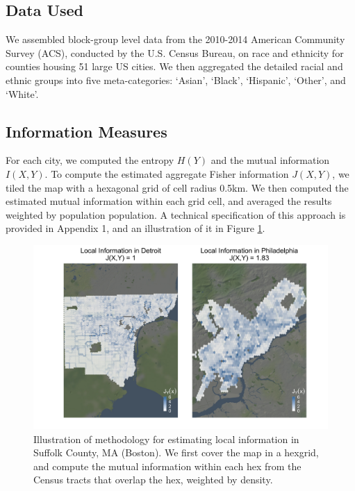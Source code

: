 \nocite{Bivand2014b,Bivand2014a,Bivand2014} %

\subsection*{Data Used}
	We assembled block-group level data from the 2010-2014 American Community Survey (ACS), conducted by the U.S. Census Bureau, on race and ethnicity for counties housing 51 large US cities. We then aggregated the detailed racial and ethnic groups into five meta-categories: `Asian', `Black', `Hispanic', `Other', and `White'.

\subsection*{Information Measures}

	 For each city, we computed the entropy $H(Y)$ and the mutual information $I(X,Y)$. To compute the estimated aggregate Fisher information $J(X,Y)$, we tiled the map with a hexagonal grid of cell radius 0.5km. We then computed the estimated mutual information within each grid cell, and averaged the results weighted by population population. A technical specification of this approach is provided in Appendix 1, and an illustration of it in Figure \ref{fig:method}. 

	 \begin{figure}
		\centering
		\includegraphics[width=.8\textwidth]{figs/method_illustration.png}
		\caption{Illustration of methodology for estimating local information in Suffolk County, MA (Boston). We first cover the map in a hexgrid, and compute the mutual information within each hex from the Census tracts that overlap the hex, weighted by density. }
		\label{fig:method}
	\end{figure}



